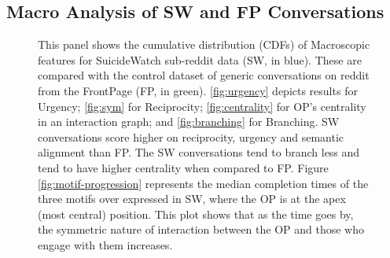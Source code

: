 \subsection{Macro Analysis of SW and FP Conversations}
 \begin{figure}[!h]
	\centering
	
    
    
\caption{This panel shows the cumulative distribution  (CDFs) of Macroscopic features for SuicideWatch sub-reddit data (SW, in blue). These are compared with the control dataset of generic conversations on reddit from the FrontPage (FP, in green). \ref{fig:urgency} depicts results for Urgency; \ref{fig:sym} for Reciprocity; \ref{fig:centrality} for OP's  centrality in an interaction graph; 
and \ref{fig:branching} for Branching. SW conversations score higher on reciprocity, urgency and semantic alignment than FP. The SW conversations tend to branch less and tend to have higher centrality when compared to FP. Figure \ref{fig:motif-progression} represents the median completion times of the three motifs over expressed in SW, where the OP is at the apex (most central) position. This plot shows that as the time goes by, the symmetric nature of interaction between the OP and those who engage with them increases.}
\end{figure}

